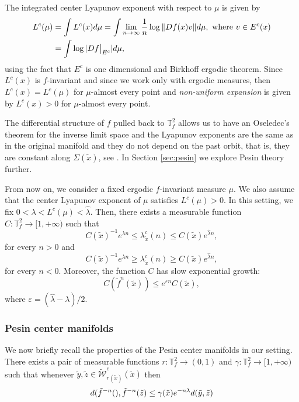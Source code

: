 \documentclass[a4paper,11pt,reqno]{amsart}
\newcommand\restr[2]{{ %
  \left.\kern-\nulldelimiterspace 
  #1 
  \vphantom{\big|} 
  \right|_{#2} 
  }}
\newcommand{\TTf}{{\mathbb{T}_f^2}}
\newcommand{\cW}{{\mathcal W}}
\newcommand{\tix}{\tilde{x}}
\newcommand{\tif}{\tilde{f}}
\newcommand{\w}{\widetilde{\cW}}
\theoremstyle{definition}
\begin{document}
The integrated center Lyapunov exponent with respect to $\mu$ is given by
\begin{align*}
    L^c(\mu) &= \int L^c(x) d\mu = \int \lim_{n \to \infty} \dfrac{1}{n} \log \Vert Df(x) v \Vert d\mu, \mbox{ where } v \in E^c(x)\\
    &= \int \log \vert \restr{Df}{E^c} \vert d\mu,
\end{align*}
using the fact that $E^c$ is one dimensional and Birkhoff ergodic theorem. Since $L^c(x)$ is $f$-invariant and since we work only with ergodic measures, then $L^c(x) =  L^c(\mu)$ for $\mu$-almost every point and \textit{non-uniform expansion} is given by $L^c(x) > 0$ for $\mu$-almost every point.

The differential structure of $f$ pulled back to $\TTf$ allows us to have an Oseledec's theorem for the inverse limit space and the Lyapunov exponents are the same as in the original manifold and they do not depend on the past orbit, that is, they are constant along $\Sigma(\tix)$, see \cite[Proposition I.3.5]{QXZ2009}. In Section \ref{sec:pesin} we explore Pesin theory further.

From now on, we consider a fixed ergodic $f$-invariant measure $\mu$. We also assume that the center Lyapunov exponent of $\mu$ satisfies $L^c(\mu)>0$. In this setting, we fix $0<\lambda<L^c(\mu)<\hat{\lambda}$. Then, there exists a measurable function $C:\TTf\to[1,+\infty)$ such that  
\[
C(\tix)^{-1}e^{\lambda n}\leq\lambda^c_{\tix}(n)\leq C(\tix)e^{\hat{\lambda} n},
\]
for every $n>0$ and 
\[
C(\tix)^{-1}e^{\lambda n}\geq\lambda^c_{\tix}(n)\geq C(\tix)e^{\hat{\lambda} n},
\]
for every $n<0$. Moreover, the function $C$ has slow exponential growth: 
\[
C(\tilde{f}^n(\tix))\leq e^{\varepsilon n} C(\tix),
\]
where $\varepsilon=(\hat{\lambda}-\lambda)/2$. 

\subsubsection{Pesin center manifolds}

We now briefly recall the properties of the Pesin center manifolds in our setting. There exists a pair of measurable functions $r:\TTf\to (0,1)$ and $\gamma:\TTf\to [1,+\infty)$ such that whenever $\tilde{y},\tilde{z}\in \w^c_{r(\tix)}(\tix)$ then 
\begin{equation}
\label{e.pesincentermanifold}
d(\tif^{-n}(\title{y}),\tif^{-n}(\tilde{z})\leq\gamma(\tix)e^{-n\lambda}d(\tilde{y},\tilde{z})
\end{equation}
\end{document}
